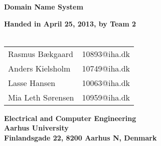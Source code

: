 \documentclass[a4paper,10pt]{report}
\begin{document}
\begin{titlepage}
\begin{center}
{\LARGE \textbf{Domain Name System}}


\vspace{4cm}
\textbf{Handed in April 25, 2013, by Team 2}\\~\\
\begin{tabular}{ll}
Rasmus Bækgaard  & 10893@iha.dk \\
Anders Kielsholm  & 10749@iha.dk \\
Lasse Hansen  & 10063@iha.dk \\
Mia Leth Sørensen & 10959@iha.dk \\
\end{tabular}
\vfill
\textbf{Electrical and Computer Engineering}\\
\textbf{Aarhus University}\\
\textbf{Finlandsgade 22, 8200 Aarhus N, Denmark}
\end{center}
\end{titlepage}















\end{document}
